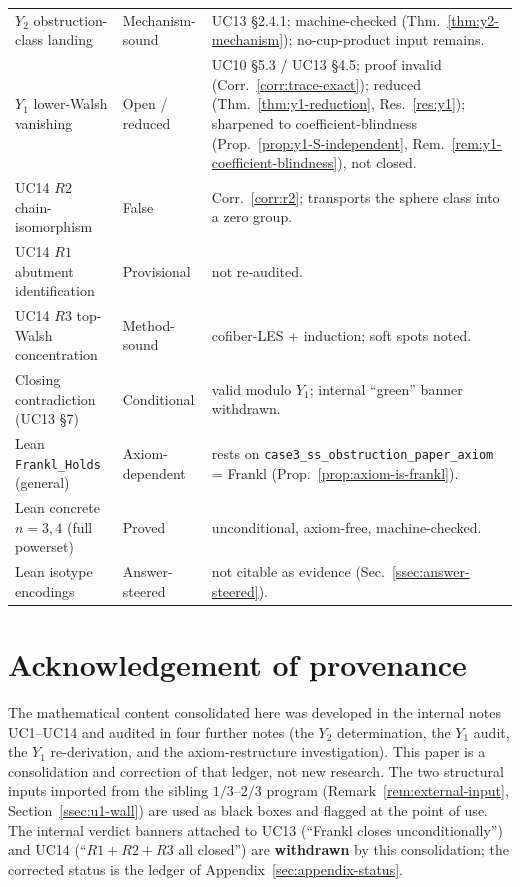 \begin{longtable}{p{}p{}p{}}
$Y_2$ obstruction-class landing & Mechanism-sound & UC13 \S2.4.1; machine-checked (Thm.~\ref{thm:y2-mechanism}); no-cup-product input remains. \\
$Y_1$ lower-Walsh vanishing & Open / reduced & UC10 \S5.3 / UC13 \S4.5; proof invalid (Corr.~\ref{corr:trace-exact}); reduced (Thm.~\ref{thm:y1-reduction}, Res.~\ref{res:y1}); sharpened to coefficient-blindness (Prop.~\ref{prop:y1-S-independent}, Rem.~\ref{rem:y1-coefficient-blindness}), not closed. \\
UC14 $R2$ chain-isomorphism & False & Corr.~\ref{corr:r2}; transports the sphere class into a zero group. \\
UC14 $R1$ abutment identification & Provisional & not re-audited. \\
UC14 $R3$ top-Walsh concentration & Method-sound & cofiber-LES + induction; soft spots noted. \\
Closing contradiction (UC13 \S7) & Conditional & valid modulo $Y_1$; internal ``green'' banner withdrawn. \\
Lean \texttt{Frankl\_Holds} (general) & Axiom-dependent & rests on \texttt{case3\_ss\_obstruction\_paper\_axiom} = Frankl (Prop.~\ref{prop:axiom-is-frankl}). \\
Lean concrete $n=3,4$ (full powerset) & Proved & unconditional, axiom-free, machine-checked. \\
Lean isotype encodings & Answer-steered & not citable as evidence (Sec.~\ref{ssec:answer-steered}). \\
\end{longtable}

\section*{Acknowledgement of provenance}

The mathematical content consolidated here was developed in the
internal notes UC1--UC14 and audited in four further notes
(the $Y_2$ determination, the $Y_1$ audit, the $Y_1$ re-derivation, and
the axiom-restructure investigation). This paper is a consolidation and
correction of that ledger, not new research. The two structural inputs
imported from the sibling $1/3$--$2/3$ program
(Remark~\ref{rem:external-input}, Section~\ref{ssec:u1-wall}) are used
as black boxes and flagged at the point of use. The internal
verdict banners attached to UC13 (``Frankl closes unconditionally'')
and UC14 (``$R1+R2+R3$ all closed'') are \textbf{withdrawn} by this
consolidation; the corrected status is the ledger of
Appendix~\ref{sec:appendix-status}.

